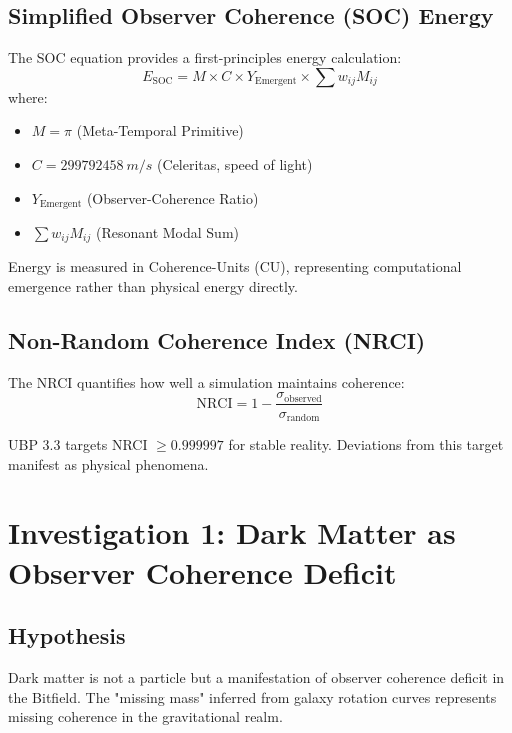 \documentclass[12pt,a4paper]{article}
\begin{document}
\subsection{Simplified Observer Coherence (SOC) Energy}

The SOC equation provides a first-principles energy calculation:
\begin{equation}
E_{\text{SOC}} = M \times C \times Y_{\text{Emergent}} \times \sum w_{ij} M_{ij}
\end{equation}
where:
\begin{itemize}
\item $M = \pi$ (Meta-Temporal Primitive)
\item $C = \SI{299792458}{m/s}$ (Celeritas, speed of light)
\item $Y_{\text{Emergent}}$ (Observer-Coherence Ratio)
\item $\sum w_{ij} M_{ij}$ (Resonant Modal Sum)
\end{itemize}

Energy is measured in Coherence-Units (CU), representing computational emergence rather than physical energy directly.

\subsection{Non-Random Coherence Index (NRCI)}

The NRCI quantifies how well a simulation maintains coherence:
\begin{equation}
\text{NRCI} = 1 - \frac{\sigma_{\text{observed}}}{\sigma_{\text{random}}}
\end{equation}

UBP 3.3 targets NRCI $\geq 0.999997$ for stable reality. Deviations from this target manifest as physical phenomena.

\section{Investigation 1: Dark Matter as Observer Coherence Deficit}

\subsection{Hypothesis}

Dark matter is not a particle but a manifestation of observer coherence deficit in the Bitfield. The "missing mass" inferred from galaxy rotation curves represents missing coherence in the gravitational realm.
\end{document}
